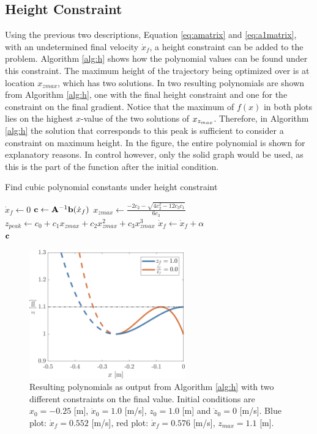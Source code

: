 \subsection{Height Constraint}
Using the previous two descriptions, Equation \ref{eq:amatrix} and \ref{eq:a1matrix}, with an undetermined final velocity $\dot{x}_f$, a height constraint can be added to the problem. Algorithm \ref{alg:h} shows how the polynomial values can be found under this constraint. The maximum height of the trajectory being optimized over is at location $x_{zmax}$, which has two solutions. In  two resulting polynomials are shown from Algorithm \ref{alg:h}, one with the final height constraint and one for the constraint on the final gradient. Notice that the maximum of $f(x)$ in both plots lies on the highest $x$-value of the two solutions of $x_{z_{max}}$. Therefore, in Algorithm \ref{alg:h} the solution that corresponds to this peak is sufficient to consider a constraint on maximum height. In the figure, the entire polynomial is shown for explanatory reasons. In control however, only the solid graph would be used, as this is the part of the function after the initial condition.
\begin{algorithm}
\caption{Find cubic polynomial constants under height constraint}
\label{alg:h}
\begin{algorithmic}[1]
    \State $\dot{x}_{f}\gets 0$
        \Repeat
            \State $\mathbf{c}\gets \mathbf{A}^{-1}\mathbf{b}(\dot{x}_{f})$ 
            \State $x_{zmax}\gets \frac{-2c_2 - \sqrt{4c_2^2-12c_3c_1}}{6c_3}$ 
            \State $z_{peak} \gets c_0 + c_1x_{zmax} + c_2x_{zmax}^2+ c_3x_{zmax}^3$ 
            \State $\dot{x}_{f} \gets \dot{x}_{f}+\alpha$   
        \\
    \Return $\mathbf{c}$
\end{algorithmic}
\end{algorithm}
\begin{figure}[h]
\centering
\includegraphics[width=0.6\textwidth]{STYLESTUFF/polynomialHeightViz.png}
\caption{Resulting polynomials as output from Algorithm \ref{alg:h} with two different constraints on the final value. Initial conditions are $x_0=-0.25$ [m], $\dot{x}_0=1.0$ [m/s], $z_0=1.0$ [m] and $\dot{z}_0=0$ [m/s]. Blue plot: $\dot{x}_f=0.552$ [m/s], red plot: $\dot{x}_f=0.576$ [m/s], $z_{max}=1.1$ [m]. }
\label{fig:polheight}
\end{figure}

